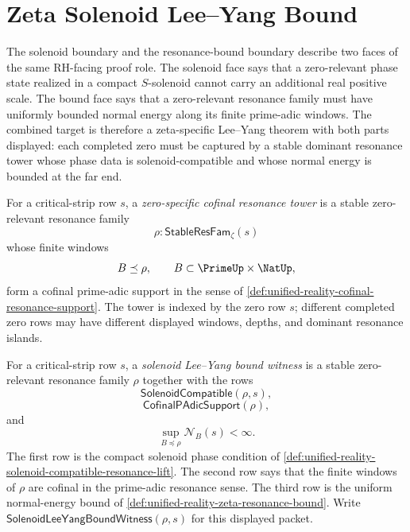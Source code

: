 \section{Zeta Solenoid Lee--Yang Bound}
\label{sec:unified-reality-zeta-solenoid-lee-yang-bound}

The solenoid boundary and the resonance-bound boundary describe two
faces of the same RH-facing proof role.  The solenoid face says that a
zero-relevant phase state realized in a compact $S$-solenoid cannot
carry an additional real positive scale.  The bound face says that a
zero-relevant resonance family must have uniformly bounded normal energy
along its finite prime-adic windows.  The combined target is therefore a
zeta-specific Lee--Yang theorem with both parts displayed: each completed
zero must be captured by a stable dominant resonance tower whose phase
data is solenoid-compatible and whose normal energy is bounded at the
far end.

\begin{definition}
\label{def:unified-reality-zero-specific-cofinal-resonance-tower}
For a critical-strip row $s$, a \emph{zero-specific cofinal resonance
tower} is a stable zero-relevant resonance family
$$
\rho:\mathsf{StableResFam}_{\zeta}(s)
$$
whose finite windows
$$
B\preceq\rho,
\qquad
B\subset\PrimeUp\times\NatUp,
$$
form a cofinal prime-adic support in the sense of
\autoref{def:unified-reality-cofinal-resonance-support}.  The tower is
indexed by the zero row $s$; different completed zero rows may have
different displayed windows, depths, and dominant resonance islands.
\end{definition}

\begin{definition}
\label{def:unified-reality-solenoid-lee-yang-bound-witness}
For a critical-strip row $s$, a \emph{solenoid Lee--Yang bound witness}
is a stable zero-relevant resonance family $\rho$ together with the rows
$$
\mathsf{SolenoidCompatible}(\rho,s),
$$
$$
\mathsf{CofinalPAdicSupport}(\rho),
$$
and
$$
\sup_{B\preceq\rho}\mathcal N_B(s)<\infty.
$$
The first row is the compact solenoid phase condition of
\autoref{def:unified-reality-solenoid-compatible-resonance-lift}.  The
second row says that the finite windows of $\rho$ are cofinal in the
prime-adic resonance sense.  The third row is the uniform normal-energy
bound of \autoref{def:unified-reality-zeta-resonance-bound}.
Write $\mathsf{SolenoidLeeYangBoundWitness}(\rho,s)$ for this displayed
packet.
\end{definition}

